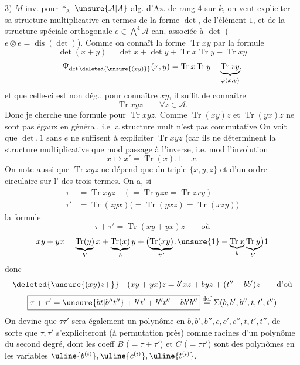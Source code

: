 3) $M$ inv. pour $\mathbin{*}_{\lambda}$
$\unsure{\mathcal{A}|A}$ alg. d'Az. de rang $4$ sur $k$, on veut expliciter sa structure multiplicative en termes de la forme $\det$, de l'élément $1$, et de la structure \uline{spéciale} orthogonale $e\in\bigwedge^4\mathcal{A}$ can.  associée à $\det$ ($e\otimes e=\operatorname{dis}(\det)$).
Comme on connaît la forme $\operatorname{Tr}xy$ par la formule
\[
\det(x+y)=\det x+\det y+\operatorname{Tr}x\operatorname{Tr}y-\operatorname{Tr}xy
\]
\[
\Psi_{\det\deleted{\unsure{(xy)}}}(x,y)=\operatorname{Tr}x\operatorname{Tr}y-\underbrace{\operatorname{Tr}xy}_{\varphi(x,y)},
\]
 et que celle-ci est non dég., pour connaître $xy$, il suffit de connaître
\[
\operatorname{Tr}xyz\qquad\forall z\in\mathcal{A}.
\]
Donc je cherche une formule pour $\operatorname{Tr}xyz$. Comme $\operatorname{Tr}(xy)z$ et $\operatorname{Tr}(yx)z$ ne sont pas égaux en général, i.e la structure mult n'est pas commutative  On voit que $\det,1$ sans $e$ ne suffisent à expliciter $\operatorname{Tr}xyz$ (car ils ne déterminent la structure multiplicative que mod passage à l'inverse, i.e. mod l'involution
\[
x\longmapsto x'=\operatorname{Tr}(x).1-x.
\]
On note aussi que $\operatorname{Tr}xyz$ ne dépend que du triple $\{x,y,z\}$ et d'un ordre circulaire sur l' des trois termes. On a,  si
\[
\begin{aligned}
\tau&=\operatorname{Tr}xyz\quad(=\operatorname{Tr}yzx=\operatorname{Tr}zxy)\\
\tau'&=\operatorname{Tr}(zyx)\bigl(=\operatorname{Tr}(yxz)=\operatorname{Tr}(xzy)\bigr)
\end{aligned}
\]
la formule
\[
\tau+\tau'=\operatorname{Tr}(xy+yx)z\qquad\text{où}
\]
\[
xy+yx=\underbrace{\operatorname{Tr}(y)}_{b'}x+\underbrace{\operatorname{Tr}(x)}_b y+\bigl(\underbrace{\operatorname{Tr}(xy)}_{t''}.\unsure{1}-\underbrace{\operatorname{Tr}x}_b\underbrace{\operatorname{Tr}y}_{b'}\bigr)1
\]
donc
\[
\deleted{\unsure{(xy)z+}}\quad
(xy+yx)z=b'xz+byz+(t''-bb')z\qquad\text{d'où}
\]
\[
\boxed{\tau+\tau'=\unsure{bt|b''t''}+b't'+b''t''-bb'b''}
\overset{\mathrm{def}}{=}\Sigma(b,b',b'',t,t',t'')
\]
On devine que $\tau\tau'$ sera également un polynôme en $b,b',b'',c,c',c'',t,t',t''$, de sorte que $\tau,\tau'$ s'expliciteront (à permutation près) comme racines d'un polynôme  du second degré, dont les coeff $B$ ($=\tau+\tau'$) et $C$ ($=\tau\tau'$) sont des polynômes en les variables $\uline{b^{(i)}},\uline{c^{(i)}},\uline{t^{(i)}}$.


